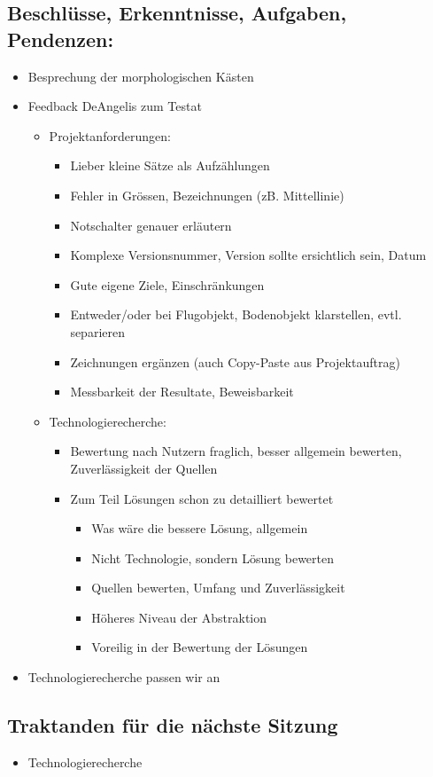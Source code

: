 \documentclass[a4paper,10pt,fleqn]{article}
\begin{document}
\subsection*{Beschlüsse, Erkenntnisse, Aufgaben, Pendenzen:}
\begin{itemize}
    \item Besprechung der morphologischen Kästen
    \item Feedback DeAngelis zum Testat
    \begin{itemize}
        \item Projektanforderungen:
        \begin{itemize}
            \item Lieber kleine Sätze als Aufzählungen
            \item Fehler in Grössen, Bezeichnungen (zB. Mittellinie)
            \item Notschalter genauer erläutern
            \item Komplexe Versionsnummer, Version sollte ersichtlich sein, Datum
            \item Gute eigene Ziele, Einschränkungen
            \item Entweder/oder bei Flugobjekt, Bodenobjekt klarstellen, evtl. separieren
            \item Zeichnungen ergänzen (auch Copy-Paste aus Projektauftrag)
            \item Messbarkeit der Resultate, Beweisbarkeit
        \end{itemize}
            \item Technologierecherche:
            \begin{itemize}
                \item Bewertung nach Nutzern fraglich, besser allgemein bewerten, Zuverlässigkeit der Quellen
                \item Zum Teil Lösungen schon zu detailliert bewertet
                \begin{itemize}
                    \item Was wäre die bessere Lösung, allgemein
                    \item Nicht Technologie, sondern Lösung bewerten
                    \item Quellen bewerten, Umfang und Zuverlässigkeit
                    \item Höheres Niveau der Abstraktion
                    \item Voreilig in der Bewertung der Lösungen
                \end{itemize}
            \end{itemize}
        \end{itemize}
    \item Technologierecherche passen wir an

\end{itemize}
%
\subsection*{Traktanden für die nächste Sitzung}
\begin{itemize}
    \item Technologierecherche
    
\end{itemize}
%
\end{document}
